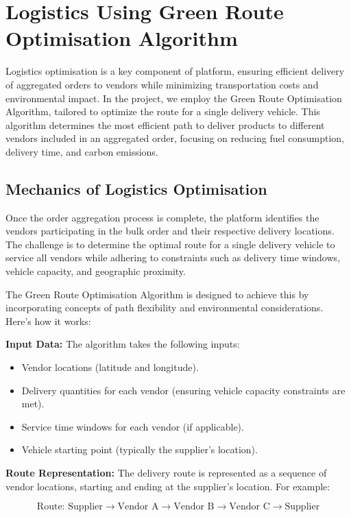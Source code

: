 \section{Logistics Using Green Route Optimisation Algorithm}

Logistics optimisation is a key component of platform, ensuring efficient delivery of aggregated orders to vendors while minimizing transportation costs and environmental impact. In the project, we employ the Green Route Optimisation Algorithm, tailored to optimize the route for a single delivery vehicle. This algorithm determines the most efficient path to deliver products to different vendors included in an aggregated order, focusing on reducing fuel consumption, delivery time, and carbon emissions.

\subsection{Mechanics of Logistics Optimisation}

Once the order aggregation process is complete, the platform identifies the vendors participating in the bulk order and their respective delivery locations. The challenge is to determine the optimal route for a single delivery vehicle to service all vendors while adhering to constraints such as delivery time windows, vehicle capacity, and geographic proximity.

The Green Route Optimisation Algorithm is designed to achieve this by incorporating concepts of path flexibility and environmental considerations. Here's how it works:

\textbf{Input Data:}
The algorithm takes the following inputs:
\begin{itemize}
    \item Vendor locations (latitude and longitude).
    \item Delivery quantities for each vendor (ensuring vehicle capacity constraints are met).
    \item Service time windows for each vendor (if applicable).
    \item Vehicle starting point (typically the supplier's location).
\end{itemize}

\textbf{Route Representation:}
The delivery route is represented as a sequence of vendor locations, starting and ending at the supplier's location. For example:

\[
    \text{Route: Supplier} \rightarrow \text{Vendor A} \rightarrow \text{Vendor B} \rightarrow \text{Vendor C} \rightarrow \text{Supplier}
\]

